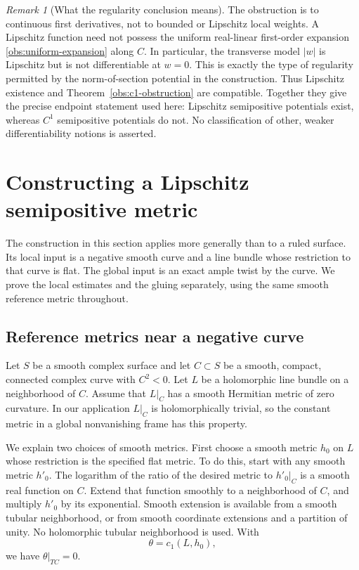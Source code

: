 \documentclass[11pt,a4paper]{article}
\numberwithin{equation}{section}
\theoremstyle{definition}
\theoremstyle{remark}
\newtheorem{remark}[theorem]{Remark}
\newcommand{\cOne}{c_1}
\begin{document}
\begin{remark}[What the regularity conclusion means]
\label{obs:regularity-meaning}
The obstruction is to continuous first derivatives, not to bounded or
Lipschitz local weights.  A Lipschitz function need not possess the
uniform real-linear first-order expansion
\eqref{obs:uniform-expansion} along $C$.  In particular, the transverse
model $|w|$ is Lipschitz but is not differentiable at $w=0$.  This is
exactly the type of regularity permitted by the norm-of-section
potential in the construction.  Thus Lipschitz existence and
Theorem~\ref{obs:c1-obstruction} are compatible.  Together they give
the precise endpoint statement used here: Lipschitz semipositive
potentials exist, whereas $C^1$ semipositive potentials do not.  No
classification of other, weaker differentiability notions is asserted.
\end{remark}

\section{Constructing a Lipschitz semipositive metric}
\label{sec:metrics}

The construction in this section applies more generally than to a ruled
surface. Its local input is a negative smooth curve and a line bundle
whose restriction to that curve is flat. The global input is an exact
ample twist by the curve. We prove the local estimates and the gluing
separately, using the same smooth reference metric throughout.

\subsection{Reference metrics near a negative curve}

Let $S$ be a smooth complex surface and let $C\subset S$ be a smooth,
compact, connected complex curve with $C^2<0$. Let $L$ be a holomorphic
line bundle on a neighborhood of $C$. Assume that $L|_C$ has a smooth
Hermitian metric of zero curvature. In our application $L|_C$ is
holomorphically trivial, so the constant metric in a global nonvanishing
frame has this property.

We explain two choices of smooth metrics. First choose a smooth metric
$h_0$ on $L$ whose restriction is the specified flat metric. To do this,
start with any smooth metric $h'_0$. The logarithm of the ratio of the
desired metric to $h'_0|_C$ is a smooth real function on $C$. Extend that
function smoothly to a neighborhood of $C$, and multiply $h'_0$ by its
exponential. Smooth extension is available from a smooth tubular
neighborhood, or from smooth coordinate extensions and a partition of
unity. No holomorphic tubular neighborhood is used. With
\[
                  \theta=\cOne(L,h_0),
\]
we have $\theta|_{TC}=0$.
\end{document}
